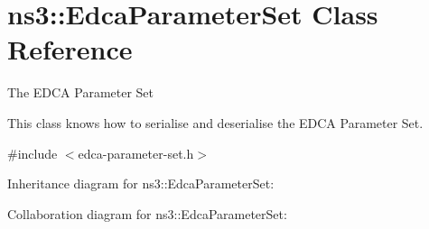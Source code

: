 \hypertarget{classns3_1_1EdcaParameterSet}{}\section{ns3\+:\+:Edca\+Parameter\+Set Class Reference}
\label{classns3_1_1EdcaParameterSet}


The E\+D\+CA Parameter Set

This class knows how to serialise and deserialise the E\+D\+CA Parameter Set.  




{\ttfamily \#include $<$edca-\/parameter-\/set.\+h$>$}



Inheritance diagram for ns3\+:\+:Edca\+Parameter\+Set\+:


Collaboration diagram for ns3\+:\+:Edca\+Parameter\+Set\+:
